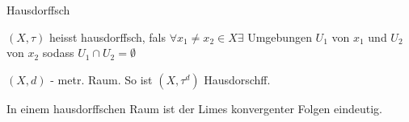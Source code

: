 \documentclass[class=article, crop=false]{standalone}
\begin{document}
\begin{zettel}{Hausdorffsch}
\begin{flashcard}
    \begin{definition}[hausdorffsch]
        $(X, \tau )$ heisst hausdorffsch, fals $\forall x_1 \neq x_2 \in  X \exists $ Umgebungen $U_1 $  von $x_1 $ und $U_2 $ von $x_2$ sodass $U_1 \cap U_2 = \emptyset$  
    \end{definition}
\end{flashcard}
\begin{example}
    $(X,d) $ - metr. Raum. So ist $ (X,\tau^d) $ Hausdorschff.
\end{example}
\begin{lemma}
   In einem hausdorffschen Raum ist der Limes konvergenter Folgen eindeutig.
\end{lemma}
\end{zettel}
\end{document}
